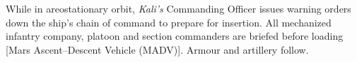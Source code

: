 While in areostationary orbit, {\it Kali's} Commanding Officer issues warning orders down the ship's chain of command to prepare for insertion. All mechanized infantry company, platoon and section commanders are briefed before loading [Mars Ascent--Descent Vehicle (MADV)]. Armour and artillery follow.
\StopTimelineDate

